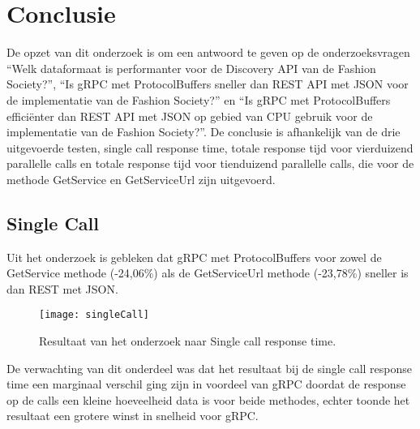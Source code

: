 
\chapter{Conclusie}
\label{ch:conclusie}


De opzet van dit onderzoek is om een antwoord te geven op de onderzoeksvragen “Welk dataformaat is performanter voor de Discovery API van de Fashion Society?”, “Is gRPC met ProtocolBuffers sneller dan REST API met JSON voor de implementatie van de Fashion Society?” en “Is gRPC met ProtocolBuffers efficiënter dan REST API met JSON op gebied van CPU gebruik voor de implementatie van de Fashion Society?”.
De conclusie is afhankelijk van de drie uitgevoerde testen, single call response time, totale response tijd voor vierduizend parallelle calls en totale response tijd voor tienduizend parallelle calls, die voor de methode GetService en GetServiceUrl zijn uitgevoerd.

\section{Single Call}
\label{sec:Single Call}
Uit het onderzoek is gebleken dat gRPC met ProtocolBuffers voor zowel de GetService methode (-24,06\%) als de GetServiceUrl methode (-23,78\%) sneller is dan REST met JSON.
\begin{figure}[H]
    \centering
    \texttt{[image: singleCall]}
    \caption[Single Call Response Time]{Resultaat van het onderzoek naar Single call response time.}
    \label{fig:SingleCallResult}
\end{figure}

De verwachting van dit onderdeel was dat het resultaat bij de single call response time een marginaal verschil ging zijn in voordeel van gRPC doordat de response op de calls een kleine hoeveelheid data is voor beide methodes, echter toonde het resultaat een grotere winst in snelheid voor gRPC.


